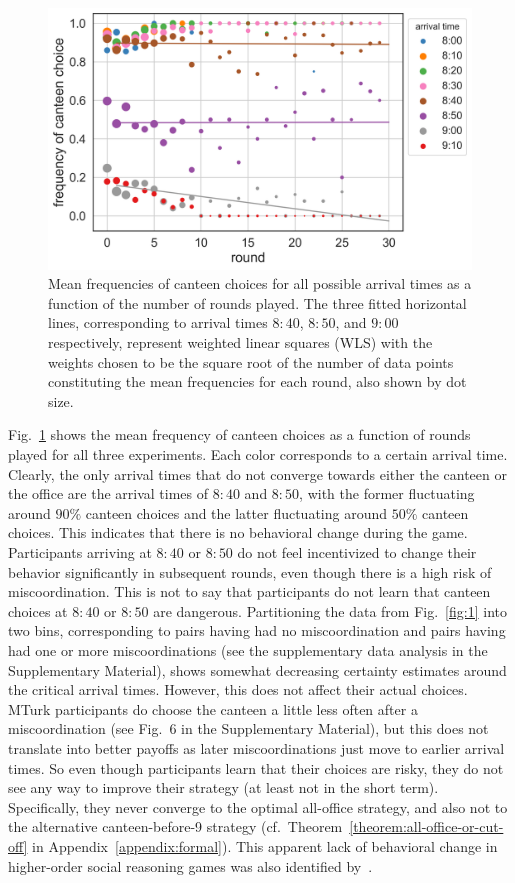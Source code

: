 \documentclass[twocolumn,a4paper,superscriptaddress,nofootinbib]{revtex4}
\begin{document}
\begin{figure} %
\centering\includegraphics[width=0.8\linewidth]{fig4.png}
\caption{Mean frequencies of canteen choices for all possible arrival times as a function of the number of rounds played. The three fitted horizontal lines, corresponding to arrival times $8{:}40$, $8{:}50$, and $9{:}00$ respectively, represent weighted linear squares (WLS) with the weights chosen to be the square root of the number of data points constituting the mean frequencies for each round, also shown by dot size.}
\label{timeseries}
\end{figure}
Fig.~\ref{timeseries} shows the mean frequency of canteen choices as a function of rounds played for all three experiments. Each color corresponds to a certain arrival time. Clearly, the only arrival times that do not converge towards either the canteen or the office are the arrival times of $8{:}40$ and $8{:}50$, with the former fluctuating around $90\%$ canteen choices and the latter fluctuating around $50\%$ canteen choices. This indicates that there is no behavioral change during the game. Participants arriving at $8{:}40$ or $8{:}50$ do not feel incentivized to change their behavior significantly in subsequent rounds, even though there is a high risk of miscoordination. This is not to say that participants do not learn that canteen choices at $8{:}40$ or $8{:}50$ are dangerous. Partitioning the data from Fig.~\ref{fig:1} into two bins, corresponding to pairs having had no miscoordination and pairs having had one or more miscoordinations (see the supplementary data analysis in the Supplementary Material), shows somewhat decreasing certainty estimates around the critical arrival times. However, this does not affect their actual choices. MTurk participants do choose the canteen a little less often after a miscoordination (see Fig.~6 in the Supplementary Material), but this does not translate into better payoffs as later miscoordinations just move to earlier arrival times. So even though participants learn that their choices are risky, they do not see any way to improve their strategy (at least not in the short term). Specifically, they never converge to the optimal all-office strategy, and also not to the alternative canteen-before-9 strategy (cf.\ Theorem~\ref{theorem:all-office-or-cut-off} in Appendix~\ref{appendix:formal}). This apparent lack of behavioral change in higher-order social reasoning games was also identified by~\citet{verbrugge2008learning}. 
\end{document}
